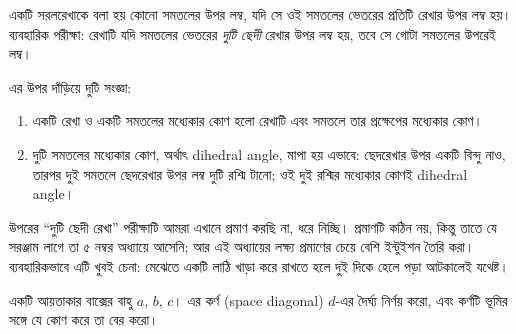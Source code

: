 \documentclass[11pt]{article}
\begin{document}
\begin{idea}[লম্বতা ও কোণ]
একটি সরলরেখাকে বলা হয় কোনো সমতলের উপর লম্ব, যদি সে ওই সমতলের ভেতরের প্রতিটি
রেখার উপর লম্ব হয়। ব্যবহারিক পরীক্ষা: রেখাটি যদি সমতলের ভেতরের \emph{দুটি ছেদী}
রেখার উপর লম্ব হয়, তবে সে গোটা সমতলের উপরেই লম্ব।

এর উপর দাঁড়িয়ে দুটি সংজ্ঞা:
\begin{enumerate}
  \item একটি রেখা ও একটি সমতলের মধ্যেকার কোণ হলো রেখাটি এবং সমতলে তার প্রক্ষেপের
        মধ্যেকার কোণ।
  \item দুটি সমতলের মধ্যেকার কোণ, অর্থাৎ dihedral angle, মাপা হয় এভাবে: ছেদরেখার
        উপর একটি বিন্দু নাও, তারপর দুই সমতলে ছেদরেখার উপর লম্ব দুটি রশ্মি টানো;
        ওই দুই রশ্মির মধ্যেকার কোণই dihedral angle।
\end{enumerate}
\end{idea}

উপরের ``দুটি ছেদী রেখা'' পরীক্ষাটি আমরা এখানে প্রমাণ করছি না, ধরে নিচ্ছি। প্রমাণটি
কঠিন নয়, কিন্তু তাতে যে সরঞ্জাম লাগে তা ৫ নম্বর অধ্যায়ে আসেনি; আর এই
অধ্যায়ের লক্ষ্য প্রমাণের চেয়ে বেশি ইন্টুইশন তৈরি করা। ব্যবহারিকভাবে এটি খুবই
চেনা: মেঝেতে একটি লাঠি খাড়া করে রাখতে হলে দুই দিকে হেলে পড়া আটকালেই যথেষ্ট।

\begin{example}
একটি আয়তাকার বাক্সের বাহু $a$, $b$, $c$। এর কর্ণ (space diagonal) $d$-এর দৈর্ঘ্য
নির্ণয় করো, এবং কর্ণটি ভূমির সঙ্গে যে কোণ করে তা বের করো।
\end{example}
\end{document}
